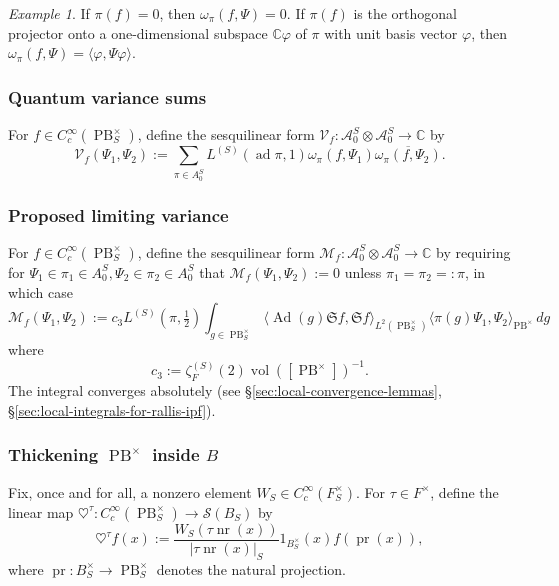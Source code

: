 \documentclass[reqno,10pt]{amsart}
\theoremstyle{plain} %
\theoremstyle{definition}
\theoremstyle{plain} %
\theoremstyle{remark}
\newtheorem*{example*}    {Example}
\theoremstyle{itplain} %
\theoremstyle{remark} %
\numberwithin{equation}{section}
\DeclareMathOperator{\ad}{ad}
\DeclareMathOperator{\Ad}{Ad}
\def\PB{\operatorname{PB}}
\DeclareMathOperator{\pr}{pr}
\DeclareMathOperator{\vol}{vol}
\DeclareMathOperator{\nr}{nr}
\begin{document}
\begin{example*}\label{example:harmonic-sum-attached-to-orth-proj}
  If $\pi(f) = 0$, then $\omega_\pi(f,\Psi) = 0$.  If $\pi(f)$ is the orthogonal projector onto a one-dimensional subspace $\mathbb{C} \varphi$ of $\pi$ with unit basis vector $\varphi$, then $\omega_\pi(f,\Psi) = \langle \varphi, \Psi \varphi \rangle$.
\end{example*}

\subsubsection{Quantum variance sums}\label{sec:35ac3e5744}
For $f \in C_c^\infty(\PB^\times_S)$, define the sesquilinear form $\mathcal{V}_f : \mathcal{A}_0^S \otimes \mathcal{A}_0^S \rightarrow \mathbb{C}$ by
\[\mathcal{V}_f(\Psi_1,\Psi_2)
  := \sum_{\pi \in A_0^S} L^{(S)}(\ad \pi,1) \omega_\pi( f,\Psi_1) \overline{ \omega_\pi( f,\Psi_2) }.
\]

\subsubsection{Proposed limiting variance}\label{sec:35ac3e5745}
For $f \in C_c^\infty(\PB^\times_S)$, define the sesquilinear form $\mathcal{M}_f : \mathcal{A}_0^S \otimes \mathcal{A}_0^S \rightarrow \mathbb{C}$ by requiring for $\Psi_1 \in \pi_1 \in A_0^S, \Psi_2 \in \pi_2 \in A_0^S$ that $\mathcal{M}_f(\Psi_1,\Psi_2) := 0$ unless $\pi_1 = \pi_2 =: \pi$, in which case
\[
  \mathcal{M}_f(\Psi_1,\Psi_2) := c_3 L^{(S)}(\pi,\tfrac{1}{2}) \int_{g \in \PB^\times_S} \langle \Ad(g) \mathfrak{S} f, \mathfrak{S} f \rangle_{L^2(\PB^\times_S)} \langle \pi(g) \Psi_1, \Psi_2 \rangle_{\PB^\times} \, d g
\]
where
\begin{equation}\label{eq:defn-of-c}
  c_3 :=
  \zeta_F^{(S)}(2)  \vol([\PB^\times])^{-1}.
\end{equation}
The integral converges absolutely (see \S\ref{sec:local-convergence-lemmas},
\S\ref{sec:local-integrals-for-rallis-ipf}).

\subsubsection{Thickening $\PB^\times$ inside $B$}\label{sec:heartsuit}

Fix, once and for all, a nonzero element $W_S \in C_c^\infty(F_S^\times)$.  For $\tau \in F^\times$, define the linear map $\heartsuit^{\tau} : C_c^\infty(\PB^\times_S) \rightarrow \mathcal{S}(B_S)$ by
\[
  \heartsuit^{\tau} f(x) := \frac{W_S(\tau \nr(x))}{|\tau \nr(x)|_S} 1_{B_S^\times}(x) f(\pr(x)),
\]
where $\pr : B_S^\times \rightarrow \PB^\times_S$ denotes the natural projection.
  
\end{document}
